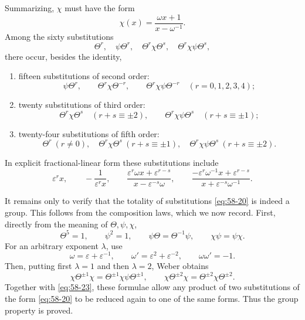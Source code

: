 \documentclass[11pt]{article}
\newcommand{\eps}{\varepsilon}
\begin{document}
Summarizing, \(\chi\) must have the form
\begin{equation}\label{eq:58-19}
 \chi(x)=\frac{\omega x+1}{x-\omega^{-1}}.
\end{equation}
Among the sixty substitutions
\begin{equation}\label{eq:58-20}
 \Theta^r,
 \quad \psi\Theta^r,
 \quad \Theta^r\chi\Theta^s,
 \quad \Theta^r\chi\psi\Theta^s,
\end{equation}
there occur, besides the identity,
\begin{enumerate}[label=\arabic*.]
\item fifteen substitutions of second order:
\[
 \psi\Theta^r,
 \qquad \Theta^r\chi\Theta^{-r},
 \qquad \Theta^r\chi\psi\Theta^{-r}
 \quad (r=0,1,2,3,4);
\]
\item twenty substitutions of third order:
\[
 \Theta^r\chi\Theta^s\quad(r+s\equiv\pm2),
 \qquad
 \Theta^r\chi\psi\Theta^s\quad(r+s\equiv\pm1);
\]
\item twenty-four substitutions of fifth order:
\[
 \Theta^r\ (r\ne0),
 \quad \Theta^r\chi\Theta^s\ (r+s\equiv\pm1),
 \quad \Theta^r\chi\psi\Theta^s\ (r+s\equiv\pm2).
\]
\end{enumerate}
In explicit fractional-linear form these substitutions include
\begin{equation}\label{eq:58-22}
 \eps^r x,
 \qquad -\frac{1}{\eps^r x},
 \qquad
 \frac{\eps^r\omega x+\eps^{r-s}}{x-\eps^{-s}\omega},
 \qquad
 \frac{-\eps^r\omega^{-1}x+\eps^{r-s}}{x+\eps^{-s}\omega^{-1}}.
\end{equation}

It remains only to verify that the totality of substitutions \eqref{eq:58-20} is indeed a group.  This follows from the composition laws, which we now record.  First, directly from the meaning of \(\Theta,\psi,\chi\),
\begin{equation}\label{eq:58-23}
 \Theta^5=1,
 \qquad \psi^2=1,
 \qquad \psi\Theta=\Theta^{-1}\psi,
 \qquad \chi\psi=\psi\chi.
\end{equation}
For an arbitrary exponent \(\lambda\), use
\begin{equation}\label{eq:58-24}
 \omega=\eps+\eps^{-1},
 \qquad \omega'=\eps^2+\eps^{-2},
 \qquad \omega\omega'=-1.
\end{equation}
Then, putting first \(\lambda=1\) and then \(\lambda=2\), Weber obtains
\begin{equation}\label{eq:58-25}
 \chi\Theta^{\pm1}\chi=\Theta^{\pm1}\chi\psi\Theta^{\pm1},
 \qquad
 \chi\Theta^{\pm2}\chi=\Theta^{\pm2}\chi\Theta^{\pm2}.
\end{equation}
Together with \eqref{eq:58-23}, these formulae allow any product of two substitutions of the form \eqref{eq:58-20} to be reduced again to one of the same forms.  Thus the group property is proved.
\end{document}
